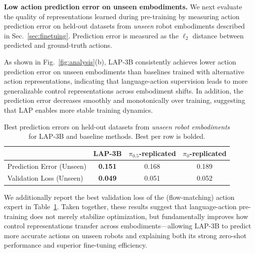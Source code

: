 \noindent\textbf{Low action prediction error on unseen embodiments.}
We next evaluate the quality of representations learned during pre-training by measuring action prediction error on held-out datasets from \emph{unseen} robot embodiments described in Sec.~\ref{sec:finetuing}. Prediction error is measured as the $\ell_2$ distance between predicted and ground-truth actions.

As shown in Fig.~\ref{fig:analysis}(b), \textsc{LAP-3B} consistently achieves lower action prediction error on unseen embodiments than baselines trained with alternative action representations, indicating that language-action supervision leads to more generalizable control representations across embodiment shifts. In addition, the prediction error decreases smoothly and monotonically over training, suggesting that LAP enables more stable training dynamics.

\begin{table}
\vspace{-12pt}
\centering
\scriptsize
\setlength{\tabcolsep}{2pt}
\renewcommand{\arraystretch}{0.95}
\caption{Best prediction errors on held-out datasets from \emph{unseen robot embodiments} for \textsc{LAP-3B} and baseline methods. Best per row is bolded.}
\label{tab:val_losses}
\begin{tabular}{lccc}
\toprule
 & \textbf{\textsc{LAP-3B}} & $\pi_{0.5}$-replicated & $\pi_{0}$-replicated \\
\midrule
Prediction Error (Unseen) & \textbf{0.151} & 0.168 & 0.189 \\
Validation Loss (Unseen) & \textbf{0.049} & 0.051 & 0.052 \\
\bottomrule
\end{tabular}
\vspace{-12pt}
\end{table}

We additionally report the best validation loss of the (flow-matching) action expert in Table~\ref{tab:val_losses}. Taken together, these results suggest that language-action pre-training does not merely stabilize optimization, but fundamentally improves how control representations transfer across embodiments—allowing \textsc{LAP-3B} to predict more accurate actions on unseen robots and explaining both its strong zero-shot performance and superior fine-tuning efficiency.





